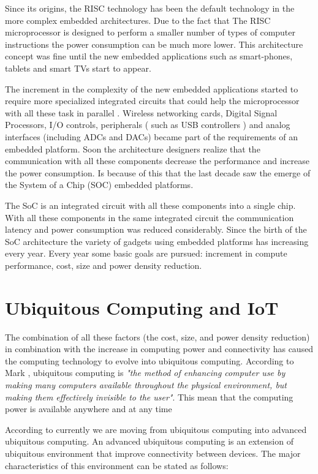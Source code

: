 Since its origins, the RISC technology has been the default technology in the
more complex embedded architectures. Due to the fact that The RISC
microprocessor is designed to perform a smaller number of types of computer
instructions the power consumption can be much more lower. This architecture
concept was fine until the new embedded applications such as smart-phones,
tablets and smart TVs start to appear.

The increment in the complexity of the new embedded applications started to
require more specialized integrated circuits that could help the microprocessor
with all these task in parallel . Wireless networking cards, Digital Signal
Processors, I/O controls, peripherals ( such as USB controllers ) and analog
interfaces (including ADCs and DACs) became part of the requirements of an
embedded platform. Soon the architecture designers realize that the
communication with all these components decrease the performance and increase
the power consumption. Is because of this that the last decade saw the emerge
of the System of a Chip (SOC)  embedded platforms. 

The SoC is an integrated circuit with all these components into a single chip.
With all these components in the same integrated circuit the communication
latency and power consumption was reduced considerably. Since the birth of the
SoC architecture the variety of gadgets using embedded platforms has increasing
every year.  Every year some basic goals are pursued:  increment in compute
performance, cost,  size and power density reduction.

\section{Ubiquitous Computing and IoT}
\noindent

The combination of all these factors (the cost, size, and power density
reduction) in combination with the increase in computing power and connectivity
has caused the computing technology to evolve into ubiquitous computing.
According to Mark \cite{Mark}, ubiquitous computing is \textit{"the method of
enhancing computer use by making many computers available throughout the
physical environment, but making them effectively invisible to the user"}. This
mean that the computing power is available anywhere and at any time


According to \cite{Nur} currently we are moving from ubiquitous computing into
advanced ubiquitous computing. An advanced ubiquitous computing is an extension
of ubiquitous environment that improve connectivity between devices. The major
characteristics of this environment can be stated as follows: 

